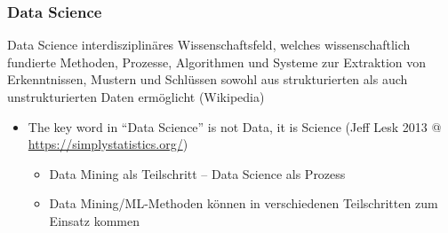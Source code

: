 \begin{frame}
  \frametitle{Data Science}

  \begin{block}{Data Science}
  interdisziplinäres Wissenschaftsfeld, welches wissenschaftlich fundierte Methoden, Prozesse, Algorithmen und Systeme zur Extraktion von Erkenntnissen, Mustern und Schlüssen sowohl aus strukturierten als auch unstrukturierten Daten ermöglicht (Wikipedia)
  \end{block}

  \begin{itemize}
  \item The key word in "`Data Science"' is not Data, it is Science (Jeff Lesk 2013 @ \url{https://simplystatistics.org/})
  \begin{itemize}
  \item Data Mining als Teilschritt -- Data Science als Prozess
  \item Data Mining/ML-Methoden können in verschiedenen Teilschritten zum Einsatz kommen
  \end{itemize}
  \end{itemize}
  \end{frame}


